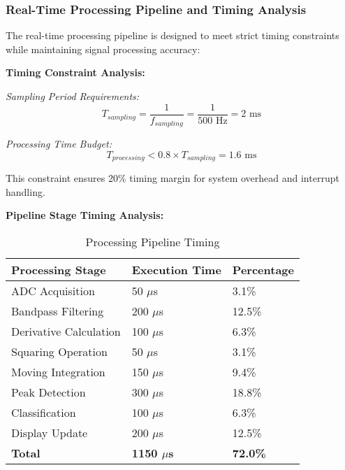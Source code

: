 \documentclass[12pt,a4paper]{article}
\begin{document}
\subsubsection{Real-Time Processing Pipeline and Timing Analysis}

The real-time processing pipeline is designed to meet strict timing constraints while maintaining signal processing accuracy:

\vspace{0.5cm}

\textbf{Timing Constraint Analysis:}

\textit{Sampling Period Requirements:}
\begin{equation*}
T_{sampling} = \frac{1}{f_{sampling}} = \frac{1}{500 \text{ Hz}} = 2 \text{ ms}
\end{equation*}

\textit{Processing Time Budget:}
\begin{equation*}
T_{processing} < 0.8 \times T_{sampling} = 1.6 \text{ ms}
\end{equation*}

This constraint ensures 20\% timing margin for system overhead and interrupt \\ handling.

\vspace{0.3cm}

\textbf{Pipeline Stage Timing Analysis:}

\begin{table}[h]
\centering
\caption{Processing Pipeline Timing}
\begin{tabular}{|l|l|l|}
\hline
\textbf{Processing Stage} & \textbf{Execution Time} & \textbf{Percentage} \\
\hline
ADC Acquisition   &  50 $\mu$s   &  3.1\%  \\
Bandpass Filtering & 200 $\mu$s  & 12.5\%  \\
Derivative Calculation & 100 $\mu$s & 6.3\% \\
Squaring Operation & 50 $\mu$s   & 3.1\%  \\
Moving Integration & 150 $\mu$s  & 9.4\%  \\
Peak Detection & 300 $\mu$s     & 18.8\% \\
Classification & 100 $\mu$s     & 6.3\%  \\
Display Update & 200 $\mu$s     & 12.5\% \\
\textbf{Total} & \textbf{1150 $\mu$s} & \textbf{72.0\%} \\
\hline
\end{tabular}
\end{table}
\end{document}
